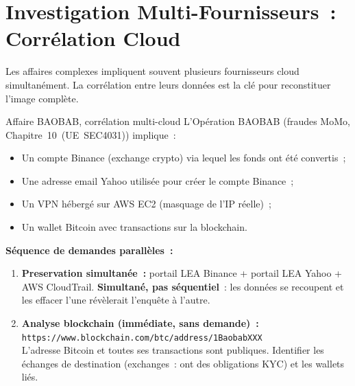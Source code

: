 \section{Investigation Multi-Fournisseurs~: Corrélation Cloud}
\label{sec:correlation-cloud}

Les affaires complexes impliquent souvent plusieurs fournisseurs cloud
simultanément. La corrélation entre leurs données est la clé pour
reconstituer l'image complète.

\begin{boxscenario}{Affaire BAOBAB, corrélation multi-cloud}
L'Opération BAOBAB (fraudes MoMo, Chapitre~10~(UE~SEC4031)) implique~:
\begin{itemize}
    \item Un compte Binance (exchange crypto) via lequel les fonds
          ont été convertis~;
    \item Une adresse email Yahoo utilisée pour créer le compte Binance~;
    \item Un VPN hébergé sur AWS EC2 (masquage de l'IP réelle)~;
    \item Un wallet Bitcoin avec transactions sur la blockchain.
\end{itemize}

\textbf{Séquence de demandes parallèles~:}

\begin{enumerate}
    \item \textbf{Preservation simultanée~:} portail LEA Binance +
          portail LEA Yahoo + AWS CloudTrail. \textbf{Simultané,
          pas séquentiel}~: les données se recoupent et les effacer
          l'une révèlerait l'enquête à l'autre.

    \item \textbf{Analyse blockchain (immédiate, sans demande)~:}\\
          \texttt{https://www.blockchain.com/btc/address/1BaobabXXX}\\
          L'adresse Bitcoin et toutes ses transactions sont publiques.
          Identifier les échanges de destination (exchanges~: ont des
          obligations KYC) et les wallets liés.


\end{enumerate}
\end{boxscenario}
